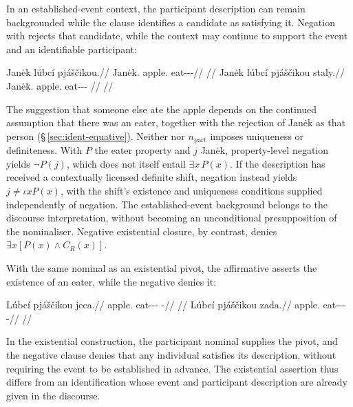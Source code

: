 In an established-event context, the participant description can remain
backgrounded while the clause identifies a candidate as satisfying it.
Negation with  rejects that candidate, while the context may
continue to support the event and an identifiable participant:

\pex
\a
\begingl
\gla Janėk lúbcí pjáščikou.//
\glb Janėk.\Dir{} apple.\Ind{} eat-\Antip{}-\Pf{}-\Nmlz{}//
\glft {} //
\endgl
\a
\begingl
\gla Janėk lúbcí pjáščikou staly.//
\glb Janėk.\Dir{} apple.\Ind{} eat-\Antip{}-\Pf{}-\Nmlz{} \Neg{}//
\glft {} //
\endgl
\xe

\noindent The suggestion that someone else ate the apple depends on the
continued assumption that there was an eater, together with the rejection of
Janėk as that person (§\,\ref{sec:ident-equative}). Neither  nor
$n_{\mathrm{part}}$ imposes uniqueness or definiteness. With \(P\) the
eater property and \(j\) Janėk, property-level negation yields
\(\neg P(j)\), which does not itself entail \(\exists x\,P(x)\).
If the description has received a contextually licensed definite shift,
negation instead yields \(j\ne\iota x P(x)\), with the shift's
existence and uniqueness conditions supplied independently of negation.
The established-event background belongs to the discourse interpretation,
without becoming an unconditional presupposition of the nominaliser.
Negative existential closure, by contrast, denies
\(\exists x[P(x)\land C_R(x)]\).

With the same nominal as an existential pivot, the affirmative asserts the
existence of an eater, while the negative denies it:

\pex
\a
\begingl
\gla Lúbcí pjáščikou jeca.//
\glb apple.\Ind{} eat-\Antip{}-\Pf{}-\Nmlz{} \Exst{}-\Cont{}//
\glft {} //
\endgl
\a
\begingl
\gla Lúbcí pjáščikou zada.//
\glb apple.\Ind{} eat-\Antip{}-\Pf{}-\Nmlz{} \NegExst{}-\Cont{}//
\glft {} //
\endgl
\xe

\noindent In the existential construction, the participant nominal supplies the
pivot, and the negative clause denies that any individual satisfies its
description, without requiring the event to be established in advance.
The existential assertion thus differs from an identification whose event and
participant description are already given in the discourse.


